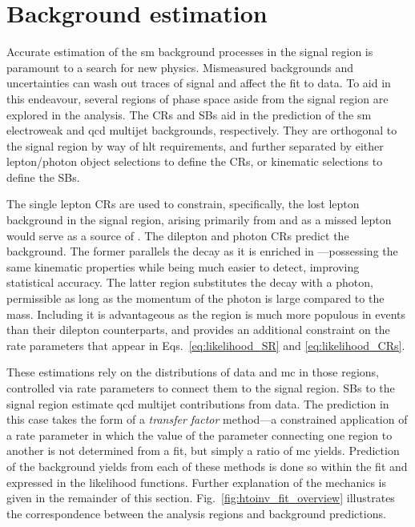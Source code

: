 \section{Background estimation}
\label{sec:htoinv_background_estimation}

Accurate estimation of the \acrlong{sm} background processes in the signal region is paramount to a search for new physics. Mismeasured backgrounds and uncertainties can wash out traces of signal and affect the fit to data. To aid in this endeavour, several regions of phase space aside from the signal region are explored in the analysis. The \glspl{CR} and \glspl{SB} aid in the prediction of the \acrshort{sm} electroweak and \acrshort{qcd} multijet backgrounds, respectively. They are orthogonal to the signal region by way of \acrlong{hlt} requirements, and further separated by either lepton/photon object selections to define the \glspl{CR}, or kinematic selections to define the \glspl{SB}.

The single lepton \glspl{CR} are used to constrain, specifically, the lost lepton background in the signal region, arising primarily from \ttbarpjets and \wtolnupjets as a missed lepton would serve as a source of \ptvecmiss. The dilepton and photon \glspl{CR} predict the \ztonunu background. The former parallels the decay as it is enriched in \ztolplmpjets---possessing the same kinematic properties while being much easier to detect, improving statistical accuracy. The latter region substitutes the \ztonunu decay with a photon, permissible as long as the momentum of the photon is large compared to the \PZ mass. Including it is advantageous as the region is much more populous in events than their dilepton counterparts, and provides an additional constraint on the rate parameters that appear in Eqs.~\ref{eq:likelihood_SR} and \ref{eq:likelihood_CRs}.

These estimations rely on the distributions of data and \acrlong{mc} in those regions, controlled via rate parameters to connect them to the signal region. \Glspl{SB} to the signal region estimate \acrshort{qcd} multijet contributions from data. The prediction in this case takes the form of a \emph{transfer factor} method---a constrained application of a rate parameter in which the value of the parameter connecting one region to another is not determined from a fit, but simply a ratio of \acrshort{mc} yields. Prediction of the background yields from each of these methods is done so within the fit and expressed in the likelihood functions. Further explanation of the mechanics is given in the remainder of this section. Fig.~\ref{fig:htoinv_fit_overview} illustrates the correspondence between the analysis regions and background predictions.

